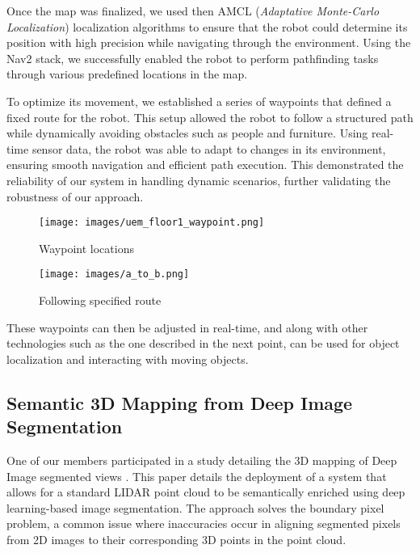 \documentclass[runningheads,a4paper]{llncs}
\begin{document}
Once the map was finalized, we used then AMCL (\textit{Adaptative Monte-Carlo Localization}) localization algorithms to ensure that the robot could determine its position with high precision while navigating through the environment. Using the Nav2 stack, we successfully enabled the robot to perform pathfinding tasks through various predefined locations in the map.

To optimize its movement, we established a series of waypoints that defined a fixed route for the robot. This setup allowed the robot to follow a structured path while dynamically avoiding obstacles such as people and furniture. Using real-time sensor data, the robot was able to adapt to changes in its environment, ensuring smooth navigation and efficient path execution. This demonstrated the reliability of our system in handling dynamic scenarios, further validating the robustness of our approach.
\begin{figure}[H]
    \centering
    \begin{minipage}{0.30\textwidth}
        \centering
        \texttt{[image: images/uem\_floor1\_waypoint.png]}
        \caption{Waypoint locations}
        \label{fig:waypoints}
    \end{minipage}
    \hfill
    \begin{minipage}{0.6\textwidth}
        \centering
        \texttt{[image: images/a\_to\_b.png]}
        \caption{Following specified route}
        \label{fig:a_to_b}
    \end{minipage}
\end{figure}

These waypoints can then be adjusted in real-time, and along with other technologies such as the one described in the next point, can be used for object localization and interacting with moving objects.



\subsection{Semantic 3D Mapping from Deep Image Segmentation}
One of our members participated in a study detailing the 3D mapping of Deep Image segmented views \cite{Martín2021Semantic}. This paper details the deployment of a system that allows for a standard LIDAR point cloud to be semantically enriched using deep learning-based image segmentation. The approach solves the boundary pixel problem, a common issue where inaccuracies occur in aligning segmented pixels from 2D images to their corresponding 3D points in the point cloud.
\end{document}
